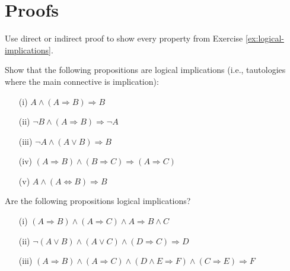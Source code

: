 \documentclass[11pt,paper=b5,footinclude,headinclude]{scrbook} %
\theoremstyle{remark}
\theoremstyle{definition} %
\theoremstyle{theorem} %
\newtheorem{ex}{Exercise\hypertarget{sol:\theex}}[chapter]
\begin{document}
\section{Proofs}
\begin{ex}
    Use direct or indirect proof to show every property from Exercise \ref{ex:logical-implications}. 
\end{ex}
    \begin{ex} Show that the following propositions are logical implications (i.e., tautologies where the main connective is implication):
        \begin{itemize}
            \item[(i)] $A \land (A \Rightarrow B) \Rightarrow B$
            \item[(ii)] $\neg B \land (A \Rightarrow B) \Rightarrow \neg A$
            \item[(iii)] $\neg A \land (A \lor B) \Rightarrow B$
            \item[(iv)] $(A \Rightarrow B) \land (B \Rightarrow C) \Rightarrow (A \Rightarrow C)$
            \item[(v)] $A \land (A \Leftrightarrow B) \Rightarrow B$
        \end{itemize}
    \end{ex} 
    \begin{ex} Are the following propositions logical implications?
\begin{itemize}
    \item[(i)] $(A \Rightarrow B) \land (A \Rightarrow C) \land A \Rightarrow B \land C$
    \item[(ii)] $\neg(A \lor B) \land (A \lor C) \land (D \Rightarrow C) \Rightarrow D$
    \item[(iii)] $(A \Rightarrow B) \land (A \Rightarrow C) \land (D \land E \Rightarrow F) \land (C \Rightarrow E) \Rightarrow F$
\end{itemize}
\end{ex}
\end{document}

